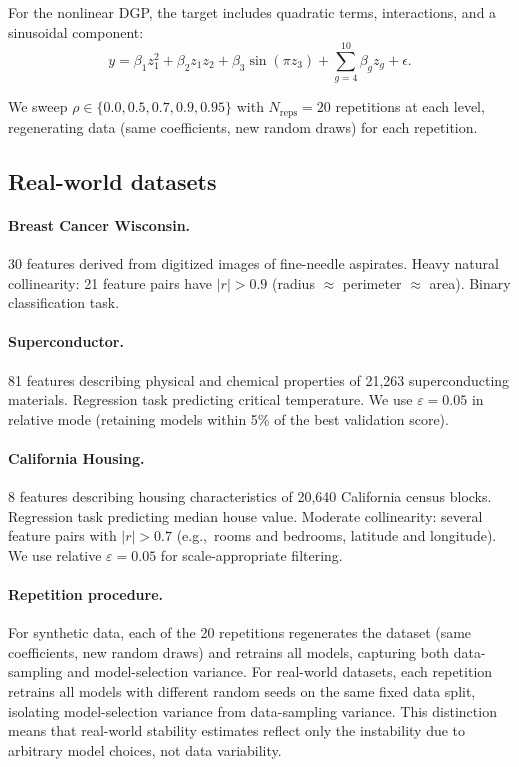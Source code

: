 \documentclass[11pt]{article}
\newcommand{\rhovar}{\rho}
\newcommand{\eg}{e.g.,\ }
\begin{document}
For the nonlinear DGP, the target includes quadratic terms, interactions,
and a sinusoidal component:
\begin{equation}
  y = \beta_1 z_1^2 + \beta_2 z_1 z_2 + \beta_3 \sin(\pi z_3) +
  \sum_{g=4}^{10} \beta_g z_g + \epsilon.
\end{equation}

We sweep $\rhovar \in \{0.0, 0.5, 0.7, 0.9, 0.95\}$ with $N_{\text{reps}}
= 20$ repetitions at each level, regenerating data (same coefficients, new
random draws) for each repetition.

\subsection{Real-world datasets}

\paragraph{Breast Cancer Wisconsin.}
30 features derived from digitized images of fine-needle aspirates. Heavy
natural collinearity: 21 feature pairs have $|r| > 0.9$ (radius $\approx$
perimeter $\approx$ area). Binary classification task.

\paragraph{Superconductor.}
81 features describing physical and chemical properties of 21,263
superconducting materials. Regression task predicting critical temperature.
We use $\varepsilon = 0.05$ in relative mode (retaining models within
5\% of the best validation score).

\paragraph{California Housing.}
8 features describing housing characteristics of 20,640 California
census blocks. Regression task predicting median house value. Moderate
collinearity: several feature pairs with $|r| > 0.7$ (\eg rooms and
bedrooms, latitude and longitude).
We use relative $\varepsilon = 0.05$ for scale-appropriate filtering.

\paragraph{Repetition procedure.}
For synthetic data, each of the 20 repetitions regenerates the dataset
(same coefficients, new random draws) and retrains all models, capturing
both data-sampling and model-selection variance. For real-world datasets,
each repetition retrains all models with different random seeds on the
same fixed data split, isolating model-selection variance from
data-sampling variance. This distinction means that real-world stability
estimates reflect only the instability due to arbitrary model choices,
not data variability.
\end{document}
